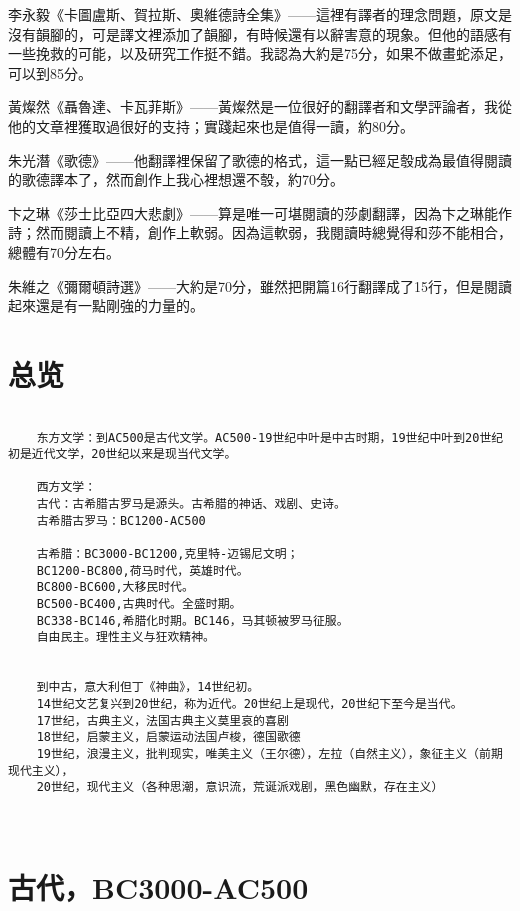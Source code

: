 \documentclass[UTF8]{../../RepresentationUniverse}
\begin{document}
李永毅《卡圖盧斯、賀拉斯、奧維德詩全集》——這裡有譯者的理念問題，原文是沒有韻腳的，可是譯文裡添加了韻腳，有時候還有以辭害意的現象。但他的語感有一些挽救的可能，以及研究工作挺不錯。我認為大約是75分，如果不做畫蛇添足，可以到85分。


黃燦然《聶魯達、卡瓦菲斯》——黃燦然是一位很好的翻譯者和文學評論者，我從他的文章裡獲取過很好的支持；實踐起來也是值得一讀，約80分。


朱光潛《歌德》——他翻譯裡保留了歌德的格式，這一點已經足彀成為最值得閱讀的歌德譯本了，然而創作上我心裡想還不彀，約70分。


卞之琳《莎士比亞四大悲劇》——算是唯一可堪閱讀的莎劇翻譯，因為卞之琳能作詩；然而閱讀上不精，創作上軟弱。因為這軟弱，我閱讀時總覺得和莎不能相合，總體有70分左右。


朱維之《彌爾頓詩選》——大約是70分，雖然把開篇16行翻譯成了15行，但是閱讀起來還是有一點剛強的力量的。


\chapter{总览}



\begin{lstlisting}

    东方文学：到AC500是古代文学。AC500-19世纪中叶是中古时期，19世纪中叶到20世纪初是近代文学，20世纪以来是现当代文学。

    西方文学：
    古代：古希腊古罗马是源头。古希腊的神话、戏剧、史诗。
    古希腊古罗马：BC1200-AC500
    
    古希腊：BC3000-BC1200,克里特-迈锡尼文明；
    BC1200-BC800,荷马时代，英雄时代。
    BC800-BC600,大移民时代。
    BC500-BC400,古典时代。全盛时期。
    BC338-BC146,希腊化时期。BC146，马其顿被罗马征服。
    自由民主。理性主义与狂欢精神。
    
    
    到中古，意大利但丁《神曲》，14世纪初。
    14世纪文艺复兴到20世纪，称为近代。20世纪上是现代，20世纪下至今是当代。
    17世纪，古典主义，法国古典主义莫里哀的喜剧
    18世纪，启蒙主义，启蒙运动法国卢梭，德国歌德
    19世纪，浪漫主义，批判现实，唯美主义（王尔德），左拉（自然主义），象征主义（前期现代主义），
    20世纪，现代主义（各种思潮，意识流，荒诞派戏剧，黑色幽默，存在主义）
    
    
\end{lstlisting}




\chapter{古代，BC3000-AC500}
\end{document}
